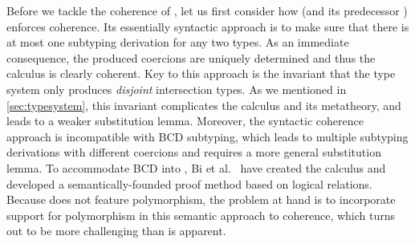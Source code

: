 Before we tackle the coherence of \fnamee, let us first consider how \fname
(and its predecessor \oname) enforces coherence. Its essentially syntactic
approach is to make sure that there is at most one subtyping derivation for any
two types. As an immediate consequence, the produced coercions are uniquely determined and thus
the calculus is clearly coherent. Key to this approach is the invariant that
the type system only produces \emph{disjoint} intersection types. As we
mentioned in \cref{sec:typesystem}, this invariant complicates the calculus
and its metatheory, and leads to a weaker substitution lemma.
Moreover, the syntactic coherence approach is incompatible with BCD subtyping,
which leads to multiple subtyping derivations with different coercions and
requires a more general substitution lemma.
To accommodate BCD into \oname, Bi et al.~\cite{bi_et_al:LIPIcs:2018:9227}
have created the \namee calculus and
developed a semantically-founded proof method based on logical relations.
Because \namee does not feature polymorphism, the problem at hand is to
incorporate support for polymorphism in this semantic approach to coherence,
which turns out to be more challenging than is apparent.


